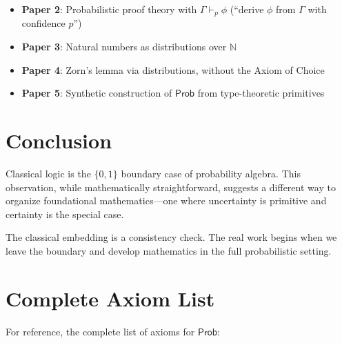\documentclass[11pt,a4paper]{article}
\newcommand{\Prob}{\mathsf{Prob}}
\begin{document}
\begin{itemize}
    \item \textbf{Paper 2}: Probabilistic proof theory with $\Gamma \vdash_p \phi$ (``derive $\phi$ from $\Gamma$ with confidence $p$'')
    \item \textbf{Paper 3}: Natural numbers as distributions over $\mathbb{N}$
    \item \textbf{Paper 4}: Zorn's lemma via distributions, without the Axiom of Choice
    \item \textbf{Paper 5}: Synthetic construction of $\Prob$ from type-theoretic primitives
\end{itemize}

\section{Conclusion}

Classical logic is the $\{0,1\}$ boundary case of probability algebra. This observation, while mathematically straightforward, suggests a different way to organize foundational mathematics---one where uncertainty is primitive and certainty is the special case.

The classical embedding is a consistency check. The real work begins when we leave the boundary and develop mathematics in the full probabilistic setting.

\appendix

\section{Complete Axiom List}

For reference, the complete list of axioms for $\Prob$:
\end{document}
